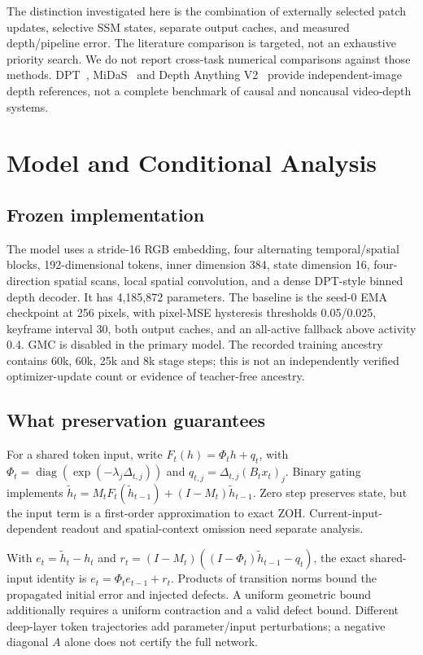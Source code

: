 \documentclass[mathematics,article,submit,moreauthors]{Definitions/mdpi}
\begin{document}
The distinction investigated here is the combination of externally selected patch updates,
selective SSM states, separate output caches, and measured depth/pipeline error.
The literature comparison is targeted, not an exhaustive priority search. We do not report
cross-task numerical comparisons against those methods. DPT~\cite{dpt}, MiDaS~\cite{midas}
and Depth Anything V2~\cite{da2} provide independent-image depth references, not a complete
benchmark of causal and noncausal video-depth systems.

\section{Model and Conditional Analysis}
\subsection{Frozen implementation}
The model uses a stride-16 RGB embedding, four alternating temporal/spatial blocks,
192-dimensional tokens, inner dimension 384, state dimension 16, four-direction spatial
scans, local spatial convolution, and a dense DPT-style binned depth decoder.
It has 4,185,872 parameters. The baseline is the seed-0 EMA checkpoint at 256 pixels,
with pixel-MSE hysteresis thresholds 0.05/0.025, keyframe interval 30, both output caches,
and an all-active fallback above activity 0.4. GMC is disabled in the primary model.
The recorded training ancestry contains 60k, 60k, 25k and 8k stage steps; this is not an
independently verified optimizer-update count or evidence of teacher-free ancestry.

\subsection{What preservation guarantees}
For a shared token input, write $F_t(h)=\Phi_t h+q_t$, with
$\Phi_t=\operatorname{diag}(\exp(-\lambda_j\Delta_{t,j}))$ and
$q_{t,j}=\Delta_{t,j}(B_tx_t)_j$. Binary gating implements
$\widetilde h_t=M_tF_t(\widetilde h_{t-1})+(I-M_t)\widetilde h_{t-1}$.
Zero step preserves state, but the input term is a first-order approximation to exact
ZOH. Current-input-dependent readout and spatial-context omission need separate analysis.

With $e_t=\widetilde h_t-h_t$ and
$r_t=(I-M_t)((I-\Phi_t)\widetilde h_{t-1}-q_t)$, the exact shared-input identity is
$e_t=\Phi_te_{t-1}+r_t$. Products of transition norms bound the propagated initial
error and injected defects. A uniform geometric bound additionally requires a uniform
contraction and a valid defect bound. Different deep-layer token trajectories add
parameter/input perturbations; a negative diagonal $A$ alone does not certify the full network.
\end{document}
